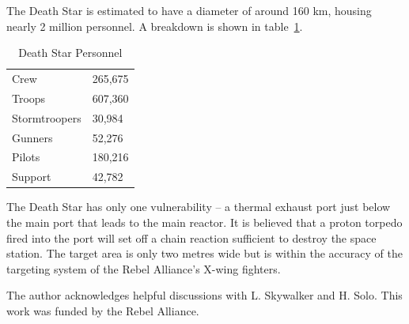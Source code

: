\documentclass[aps,prb,twocolumn,groupedaddress,10pt,longbibliography,nofootinbib]{revtex4-2}
\begin{document}
The Death Star is estimated to have a diameter of around 160 km, housing nearly 2 million personnel. A breakdown is shown in table~\ref{table:forces}.
\begin{table}%
\begin{tabular}{|l|l|}
\hline
Crew & 265,675 \\
Troops & 607,360\\
Stormtroopers & 30,984\\
Gunners & 52,276\\
Pilots & 180,216\\
Support & 42,782\\
\hline
\end{tabular}
\caption{Death Star Personnel}
\label{table:forces}
\end{table}

The Death Star has only one vulnerability -- a thermal exhaust port just below the main port that leads to the main reactor. It is believed that a proton torpedo fired into the port will set off a chain reaction sufficient to destroy the space station. The target area is only two metres wide but is within the accuracy of the targeting system of the Rebel Alliance's X-wing fighters.

\begin{acknowledgments}
The author acknowledges helpful discussions with L. Skywalker and H. Solo. This work was funded by the Rebel Alliance.
\end{acknowledgments}




\end{document}
